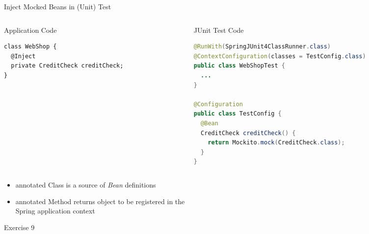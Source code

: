 \begin{frame}[fragile]{Inject Mocked Beans in (Unit) Test}

\begin{columns}
	\begin{column}[T]{.35\textwidth}
\begin{block}{Application Code}
\begin{lstlisting}
class WebShop {
  @Inject
  private CreditCheck creditCheck;
}
\end{lstlisting}
\end{block}
\end{column}
\begin{column}[T]{.6\textwidth}
\begin{block}{JUnit Test Code}
\begin{lstlisting}[language=Java,belowskip=0mm,aboveskip=0mm]
@RunWith(SpringJUnit4ClassRunner.class)
@ContextConfiguration(classes = TestConfig.class)
public class WebShopTest {
  ...
}

@Configuration
public class TestConfig {
  @Bean
  CreditCheck creditCheck() {
    return Mockito.mock(CreditCheck.class);
  }
}
\end{lstlisting}	
\end{block}
\end{column}
\end{columns}
\begin{itemize}
\item {} annotated Class is a source of \emph{Bean} definitions
\item {} annotated Method returns object to be registered in the \\Spring application context
\end{itemize}
\end{frame}


\begin{frame}{Exercise 9 }
\begin{figure}
	\end{figure}
\end{frame}

